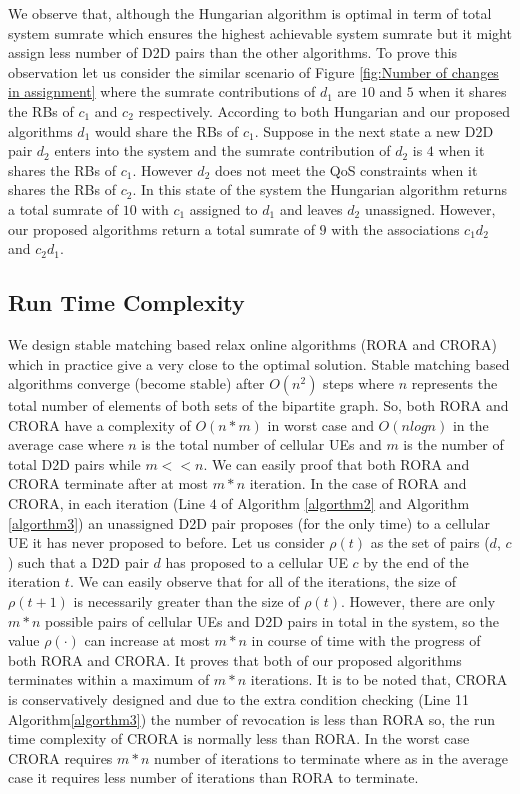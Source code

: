 \documentclass[times]{dacauth}
\begin{document}
\smallskip
\noindent
We observe that, although the Hungarian algorithm is optimal in term of total system sumrate which ensures the highest achievable system sumrate but it might assign less number of D2D pairs than the other algorithms. To prove this observation let us consider the similar scenario of Figure \ref{fig:Number of changes in assignment} where the sumrate contributions of $d_{1}$ are $10$ and $5$ when it shares the RBs of $ c_{1}$ and $ c_{2}$ respectively. According to both Hungarian and our proposed algorithms $d_{1}$ would share the RBs of $c_{1}$. Suppose in the next state a new D2D pair $d_{2}$ enters into the system and the sumrate contribution of $d_{2}$ is $4$ when it shares the RBs of $ c_{1}$. However $d_{2}$ does not meet the QoS constraints when it shares the RBs of $c_{2}$. In this state of the system the Hungarian algorithm  returns a total sumrate of $10$ with $c_1$ assigned to $d_1$ and leaves $d_2$ unassigned. However, our proposed algorithms return a total sumrate of $9$ with the associations  $c_1d_2$ and $c_2d_1$.  

\subsection{Run Time Complexity}
\smallskip
\noindent
We design stable matching based relax online algorithms (RORA and CRORA) which in practice give a very close to the optimal solution. Stable matching based algorithms converge (become stable) after $O(n^2)$ \cite{kleinberg2011algorithm} steps where $n$ represents the total number of elements of both sets of the bipartite graph. So, both  RORA and CRORA have a complexity of  $O(n*m)$ in worst case and  $O(nlogn)$ in the average case where $n$ is the total number of cellular UEs and $m$ is the number of total D2D pairs while $m<<n$. We can easily proof that both RORA and CRORA terminate after at most $m*n$ iteration. In the case of RORA and CRORA, in each iteration (Line $4$ of Algorithm \ref{algorthm2} and Algorithm \ref{algorthm3}) an unassigned D2D pair proposes (for the only time) to a cellular UE it has never proposed to before. Let us consider $\rho(t)$ as the set of pairs ($d$, $c$) such that a D2D pair $d$ has proposed to a cellular UE $c$  by the end of the iteration $t$. We can easily observe that for all of the iterations, the size of $\rho(t + 1)$ is necessarily greater than the size of $\rho(t)$. However, there are only $m*n$ possible pairs of cellular UEs and D2D pairs in total in the system, so the value $\rho(\cdot)$ can increase at most $m*n$ in course of time with the progress of both RORA and CRORA. It proves that both of our proposed algorithms terminates within a maximum of  $m*n$ iterations. It is to be noted that, CRORA is conservatively designed and due to the extra condition checking (Line 11 Algorithm\ref{algorthm3}) the number of revocation is less than RORA so, the run time complexity of CRORA is normally less than RORA. In the worst case CRORA requires $m*n$ number of iterations to terminate where as in the average case it requires less number of iterations than RORA to terminate.
\end{document}
